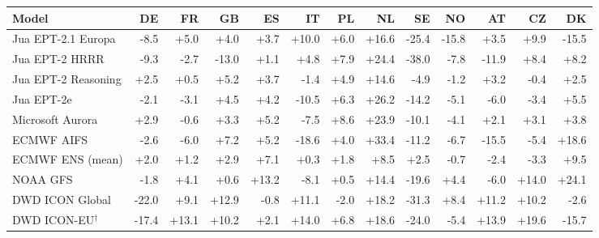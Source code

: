 \begin{tabular}{lrrrrrrrrrrrr}
\toprule
Model & DE & FR & GB & ES & IT & PL & NL & SE & NO & AT & CZ & DK \\
\midrule
Jua EPT-2.1 Europa & -8.5 & +5.0 & +4.0 & +3.7 & +10.0 & +6.0 & +16.6 & -25.4 & -15.8 & +3.5 & +9.9 & -15.5 \\
Jua EPT-2 HRRR & -9.3 & -2.7 & -13.0 & +1.1 & +4.8 & +7.9 & +24.4 & -38.0 & -7.8 & -11.9 & +8.4 & +8.2 \\
Jua EPT-2 Reasoning & +2.5 & +0.5 & +5.2 & +3.7 & -1.4 & +4.9 & +14.6 & -4.9 & -1.2 & +3.2 & -0.4 & +2.5 \\
Jua EPT-2e & -2.1 & -3.1 & +4.5 & +4.2 & -10.5 & +6.3 & +26.2 & -14.2 & -5.1 & -6.0 & -3.4 & +5.5 \\
Microsoft Aurora & +2.9 & -0.6 & +3.3 & +5.2 & -7.5 & +8.6 & +23.9 & -10.1 & -4.1 & +2.1 & +3.1 & +3.8 \\
ECMWF AIFS & -2.6 & -6.0 & +7.2 & +5.2 & -18.6 & +4.0 & +33.4 & -11.2 & -6.7 & -15.5 & -5.4 & +18.6 \\
ECMWF ENS (mean) & +2.0 & +1.2 & +2.9 & +7.1 & +0.3 & +1.8 & +8.5 & +2.5 & -0.7 & -2.4 & -3.3 & +9.5 \\
NOAA GFS & -1.8 & +4.1 & +0.6 & +13.2 & -8.1 & +0.5 & +14.4 & -19.6 & +4.4 & -6.0 & +14.0 & +24.1 \\
DWD ICON Global & -22.0 & +9.1 & +12.9 & -0.8 & +11.1 & -2.0 & +18.2 & -31.3 & +8.4 & +11.2 & +10.2 & -2.6 \\
DWD ICON-EU$^{\dagger}$ & -17.4 & +13.1 & +10.2 & +2.1 & +14.0 & +6.8 & +18.6 & -24.0 & -5.4 & +13.9 & +19.6 & -15.7 \\
\bottomrule
\end{tabular}
